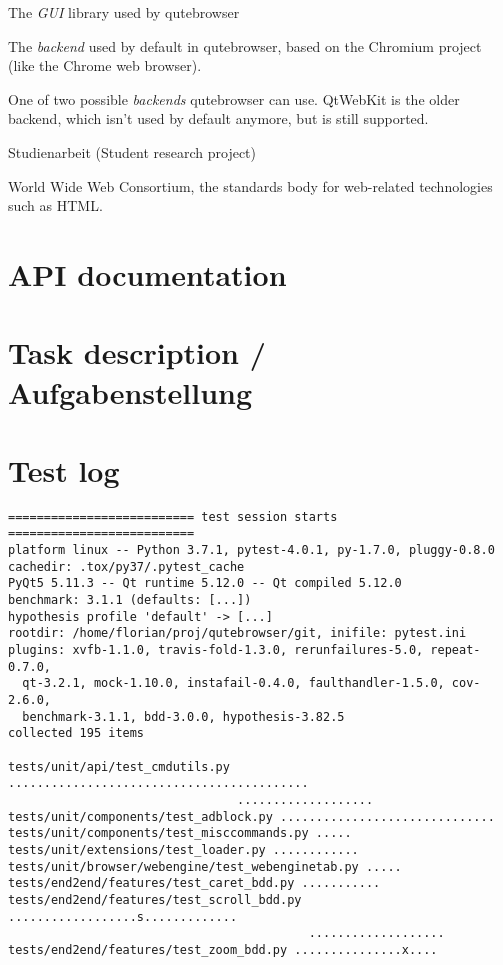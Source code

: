 \begin{appendices}
\begin{multicols}{2}
\begin{description}[leftmargin=0pt]
  \item[Qt]{The \emph{GUI} library used by qutebrowser}
  \item[QtWebEngine]{The \emph{backend} used by default in qutebrowser, based on
      the Chromium project (like the Chrome web browser).}
  \item[QtWebKit]{One of two possible \emph{backends} qutebrowser can use.
      QtWebKit is the older backend, which isn't used by default anymore, but is
      still supported.}
  \item[SA]{Studienarbeit (Student research project)}
  \item[W3C]{World Wide Web Consortium, the standards body for web-related
      technologies such as HTML.}
\end{description}
\end{multicols}

\chapter{API documentation}
\label{ch:sphinx}


\chapter{Task description / Aufgabenstellung}
\label{ch:aufgabenstellung}


\chapter{Test log}
\label{ch:testlog}
\begin{verbatim}
========================== test session starts ==========================
platform linux -- Python 3.7.1, pytest-4.0.1, py-1.7.0, pluggy-0.8.0
cachedir: .tox/py37/.pytest_cache
PyQt5 5.11.3 -- Qt runtime 5.12.0 -- Qt compiled 5.12.0
benchmark: 3.1.1 (defaults: [...])
hypothesis profile 'default' -> [...]
rootdir: /home/florian/proj/qutebrowser/git, inifile: pytest.ini
plugins: xvfb-1.1.0, travis-fold-1.3.0, rerunfailures-5.0, repeat-0.7.0,
  qt-3.2.1, mock-1.10.0, instafail-0.4.0, faulthandler-1.5.0, cov-2.6.0,
  benchmark-3.1.1, bdd-3.0.0, hypothesis-3.82.5
collected 195 items

tests/unit/api/test_cmdutils.py ..........................................
                                ...................
tests/unit/components/test_adblock.py ..............................
tests/unit/components/test_misccommands.py .....
tests/unit/extensions/test_loader.py ............
tests/unit/browser/webengine/test_webenginetab.py .....
tests/end2end/features/test_caret_bdd.py ...........
tests/end2end/features/test_scroll_bdd.py ..................s.............
                                          ...................
tests/end2end/features/test_zoom_bdd.py ...............x....



\end{verbatim}
\end{appendices}
